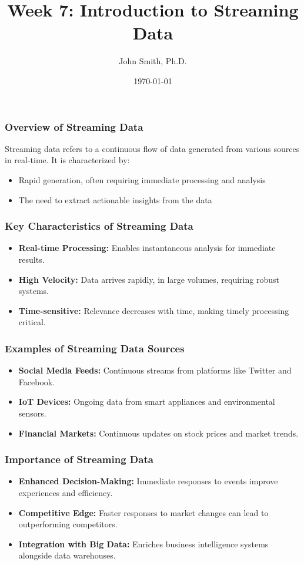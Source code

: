 \documentclass[aspectratio=169]{beamer}
\title[Streaming Data]{Week 7: Introduction to Streaming Data}
\author[J. Smith]{John Smith, Ph.D.}
\institute[University Name]{
  Department of Computer Science\\
  University Name\\
  \vspace{0.3cm}
  Email: email@university.edu\\
  Website: www.university.edu
}
\date{\today}
\begin{document}
\frame{\titlepage}

\begin{frame}[fragile]
    \titlepage
\end{frame}

\begin{frame}[fragile]
    \frametitle{Overview of Streaming Data}
    Streaming data refers to a continuous flow of data generated from various sources in real-time. It is characterized by:
    \begin{itemize}
        \item Rapid generation, often requiring immediate processing and analysis
        \item The need to extract actionable insights from the data
    \end{itemize}
\end{frame}

\begin{frame}[fragile]
    \frametitle{Key Characteristics of Streaming Data}
    \begin{itemize}
        \item \textbf{Real-time Processing:} Enables instantaneous analysis for immediate results.
        \item \textbf{High Velocity:} Data arrives rapidly, in large volumes, requiring robust systems.
        \item \textbf{Time-sensitive:} Relevance decreases with time, making timely processing critical.
    \end{itemize}
\end{frame}

\begin{frame}[fragile]
    \frametitle{Examples of Streaming Data Sources}
    \begin{itemize}
        \item \textbf{Social Media Feeds:} Continuous streams from platforms like Twitter and Facebook.
        \item \textbf{IoT Devices:} Ongoing data from smart appliances and environmental sensors.
        \item \textbf{Financial Markets:} Continuous updates on stock prices and market trends.
    \end{itemize}
\end{frame}

\begin{frame}[fragile]
    \frametitle{Importance of Streaming Data}
    \begin{itemize}
        \item \textbf{Enhanced Decision-Making:} Immediate responses to events improve experiences and efficiency.
        \item \textbf{Competitive Edge:} Faster responses to market changes can lead to outperforming competitors.
        \item \textbf{Integration with Big Data:} Enriches business intelligence systems alongside data warehouses.
    \end{itemize}
\end{frame}
\end{document}
